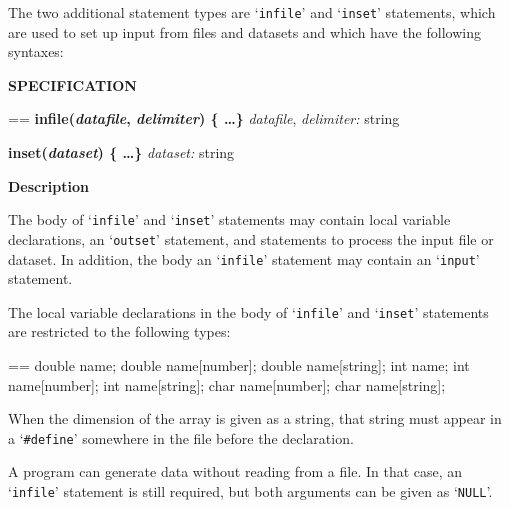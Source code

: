 \documentclass{book}
\makeatletter
\newcommand\Texinfocommandstyletextvar[1]{{\normalfont{}\textsl{#1}}}%
\newenvironment{Texinfopreformatted}{%
  \par\GNUTobeylines\obeyspaces\frenchspacing\parskip=\z@\parindent=\z@}{}
{\catcode`\^^M=13 \gdef\GNUTobeylines{\catcode`\^^M=13 \def^^M{\null\par}}}
\newenvironment{Texinfoindented}{\begin{list}{}{}\item\relax}{\end{list}}
\renewcommand{\_}{\Texinfounderscore\discretionary{}{}{}}
\makeatother
\begin{document}
The two additional statement types are `\texttt{infile}' and `\texttt{inset}'
%
%
statements, which
are used to set up input from files and datasets and which
have the following syntaxes:

\noindent{}\textbf{SPECIFICATION}

\begin{Texinfoindented}
\begin{Texinfopreformatted}%
\textbf{infile(\Texinfocommandstyletextvar{datafile}, \Texinfocommandstyletextvar{delimiter}) \{ \dots{}\@ \}}
\Texinfocommandstyletextvar{datafile}, \Texinfocommandstyletextvar{delimiter:} string

\textbf{inset(\Texinfocommandstyletextvar{dataset}) \{ \dots{}\@ \}}
\Texinfocommandstyletextvar{dataset:} string
\end{Texinfopreformatted}
\end{Texinfoindented}

\noindent{}\textbf{Description}

The body of `\texttt{infile}' and `\texttt{inset}' statements
may contain local variable declarations, an `\texttt{outset}'
statement, and statements to process the input file or dataset.
In addition, the body an `\texttt{infile}' statement may contain an
`\texttt{input}' statement.

The local variable declarations
%
%
in the body of `\texttt{infile}' and `\texttt{inset}' statements
are restricted to the following types:

\begin{Texinfoindented}
\begin{Texinfopreformatted}%
\ttfamily double name;
double name[number];
double name[string];
int name;
int name[number];
int name[string];
char name[number];
char name[string];
\end{Texinfopreformatted}
\end{Texinfoindented}

When the dimension
%
of the array
%
is given as a string, that string must
appear in a `\texttt{\#define}' somewhere in the file before the declaration.

A program can generate data without reading from
a file.  In that case, an `\texttt{infile}' statement
%
is still required, but both
arguments can be given as `\texttt{NULL}'.  
\end{document}
